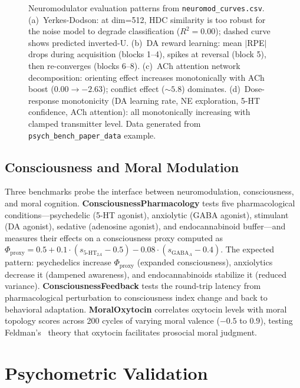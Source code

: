 \documentclass[11pt,letterpaper]{article}
\begin{document}
\begin{figure}[t]
\begin{subfigure}[b]{0.48\textwidth}
\end{subfigure}
\caption{Neuromodulator evaluation patterns from \texttt{neuromod\_curves.csv}. (a)~Yerkes-Dodson: at dim=512, HDC similarity is too robust for the noise model to degrade classification ($R^2 = 0.00$); dashed curve shows predicted inverted-U. (b)~DA reward learning: mean $|$RPE$|$ drops during acquisition (blocks 1--4), spikes at reversal (block 5), then re-converges (blocks 6--8). (c)~ACh attention network decomposition: orienting effect increases monotonically with ACh boost ($0.00 \to -2.63$); conflict effect ($\sim 5.8$) dominates. (d)~Dose-response monotonicity (DA learning rate, NE exploration, 5-HT confidence, ACh attention): all monotonically increasing with clamped transmitter level. Data generated from \texttt{psych\_bench\_paper\_data} example.}
\label{fig:neuromod}
\end{figure}

\subsection{Consciousness and Moral Modulation}

Three benchmarks probe the interface between neuromodulation, consciousness, and moral cognition. \textbf{ConsciousnessPharmacology} tests five pharmacological conditions---psychedelic (5-HT agonist), anxiolytic (GABA agonist), stimulant (DA agonist), sedative (adenosine agonist), and endocannabinoid buffer---and measures their effects on a consciousness proxy computed as $\Phi_{\text{proxy}} = 0.5 + 0.1 \cdot (s_{5\text{-HT}_{2A}} - 0.5) - 0.08 \cdot (s_{\text{GABA}_A} - 0.4)$. The expected pattern: psychedelics increase $\Phi_{\text{proxy}}$ (expanded consciousness), anxiolytics decrease it (dampened awareness), and endocannabinoids stabilize it (reduced variance). \textbf{ConsciousnessFeedback} tests the round-trip latency from pharmacological perturbation to consciousness index change and back to behavioral adaptation. \textbf{MoralOxytocin} correlates oxytocin levels with moral topology scores across 200 cycles of varying moral valence ($-0.5$ to $0.9$), testing Feldman's~\citep{feldman2012oxytocin} theory that oxytocin facilitates prosocial moral judgment.

\section{Psychometric Validation}
\label{sec:psychometrics}
\end{document}
